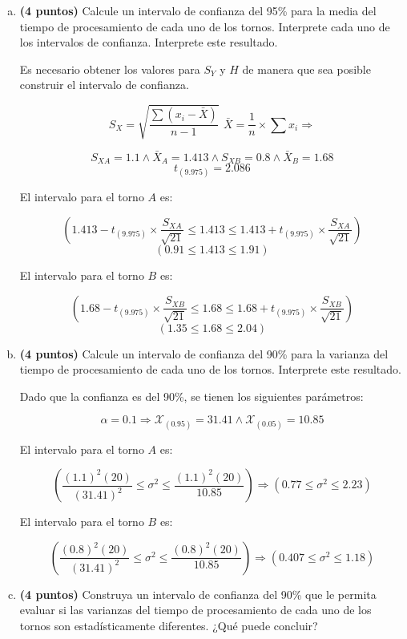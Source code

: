 \documentclass[../main.tex]{subfiles}
\begin{document}
\begin{enumerate}[(a)]

\item \textbf{(4 puntos)} Calcule un intervalo de confianza del 95\% para la media del tiempo de procesamiento de cada uno de los tornos. Interprete cada uno de los intervalos de confianza.
Interprete este resultado.

Es necesario obtener los valores para $S_Y$ y $H$ de manera que sea posible construir el intervalo de confianza.

$$S_X = \sqrt{\frac{\sum(x_i - \bar{X})}{n - 1}} \,\ \bar{X} = \frac{1}{n} \times \sum x_i \Rightarrow$$

$$S_{XA} = 1.1 \wedge \bar{X}_A = 1.413 \wedge S_{XB} = 0.8 \wedge \bar{X}_B = 1.68$$
$$t_{(9.975)} = 2.086$$

El intervalo para el torno $A$ es:

$$\left( 1.413 - t_{(9.975)} \times \frac{S_{XA}}{\sqrt{21}} \leq 1.413 \leq 1.413 + t_{(9.975)} \times \frac{S_{XA}}{\sqrt{21}}\right)$$
$$(0.91 \leq 1.413 \leq 1.91)$$

El intervalo para el torno $B$ es:

$$\left( 1.68 - t_{(9.975)} \times \frac{S_{XB}}{\sqrt{21}} \leq 1.68 \leq 1.68 + t_{(9.975)} \times \frac{S_{XB}}{\sqrt{21}}\right)$$
$$(1.35 \leq 1.68 \leq 2.04)$$

\item \textbf{(4 puntos)} Calcule un intervalo de confianza del 90\% para la varianza del tiempo de procesamiento de cada uno de los tornos. Interprete este resultado.

Dado que la confianza es del 90\%, se tienen los siguientes parámetros:

$$\alpha = 0.1 \Rightarrow \mathcal{X}_{(0.95)} = 31.41 \wedge \mathcal{X}_{(0.05)} = 10.85$$

El intervalo para el torno $A$ es:

$$\left( \frac{(1.1)^2(20)}{(31.41)^2} \leq \sigma^2 \leq \frac{(1.1)^2(20)}{10.85} \right) \Rightarrow \left( 0.77 \leq \sigma ^2 \leq 2.23 \right)$$

El intervalo para el torno $B$ es:

$$\left( \frac{(0.8)^2(20)}{(31.41)^2} \leq \sigma^2 \leq \frac{(0.8)^2(20)}{10.85} \right) \Rightarrow \left( 0.407 \leq \sigma ^2 \leq 1.18 \right)$$

\item \textbf{(4 puntos)} Construya un intervalo de confianza del 90\% que le permita evaluar si las varianzas del tiempo de procesamiento de cada uno de los tornos son estadísticamente
diferentes. ¿Qué puede concluir?


\end{enumerate}
\end{document}

